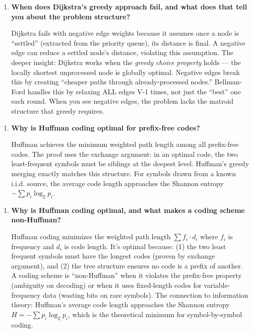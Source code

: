 \begin{enumerate}
\item \textbf{When does Dijkstra's greedy approach fail, and what does that tell you about the problem structure?}\label{faq:dijkstra-fails}

Dijkstra fails with negative edge weights because it assumes once a node is ``settled'' (extracted from the priority queue), its distance is final. A negative edge can reduce a settled node's distance, violating this assumption. The deeper insight: Dijkstra works when the \emph{greedy choice property} holds — the locally shortest unprocessed node is globally optimal. Negative edges break this by creating ``cheaper paths through already-processed nodes.'' Bellman-Ford handles this by relaxing ALL edges V-1 times, not just the ``best'' one each round. When you see negative edges, the problem lacks the matroid structure that greedy requires.
\end{enumerate}

\begin{enumerate}
\item \textbf{Why is Huffman coding optimal for prefix-free codes?}

Huffman achieves the minimum weighted path length among all prefix-free codes. The proof uses the exchange argument: in an optimal code, the two least-frequent symbols must be siblings at the deepest level. Huffman's greedy merging exactly matches this structure. For symbols drawn from a known i.i.d. source, the average code length approaches the Shannon entropy $-\sum p_i \log_2 p_i$.
\end{enumerate}

\begin{enumerate}
\item \textbf{Why is Huffman coding optimal, and what makes a coding scheme non-Huffman?}\label{faq:huffman-optimality}

Huffman coding minimizes the weighted path length $\sum f_i \cdot d_i$ where $f_i$ is frequency and $d_i$ is code length. It's optimal because: (1) the two least frequent symbols must have the longest codes (proven by exchange argument), and (2) the tree structure ensures no code is a prefix of another. A coding scheme is ``non-Huffman'' when it violates the prefix-free property (ambiguity on decoding) or when it uses fixed-length codes for variable-frequency data (wasting bits on rare symbols). The connection to information theory: Huffman's average code length approaches the Shannon entropy $H = -\sum p_i \log_2 p_i$, which is the theoretical minimum for symbol-by-symbol coding.
\end{enumerate}

